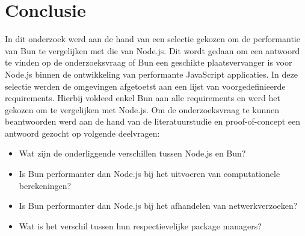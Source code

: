 
\chapter{Conclusie}%
\label{ch:conclusie}


In dit onderzoek werd aan de hand van een selectie gekozen om de performantie van Bun te vergelijken met die van Node.js. 
Dit wordt gedaan om een antwoord te vinden op de 
onderzoeksvraag of Bun een geschikte plaatsvervanger is voor Node.js binnen de ontwikkeling van performante JavaScript applicaties.
In deze selectie werden de omgevingen afgetoetst aan een lijst van voorgedefinieerde requirements. Hierbij voldeed enkel Bun aan alle 
requirements en werd het gekozen om te vergelijken met Node.js.
Om de onderzoeksvraag te kunnen beantwoorden werd aan de hand van de literatuurstudie en proof-of-concept een antwoord gezocht op volgende deelvragen:
\begin{itemize}
    \item Wat zijn de onderliggende verschillen tussen Node.js en Bun?
    \item Is Bun performanter dan Node.js bij het uitvoeren van computationele berekeningen?
    \item Is Bun performanter dan Node.js bij het afhandelen van netwerkverzoeken?
    \item Wat is het verschil tussen hun respectievelijke package managers?
  \end{itemize}

